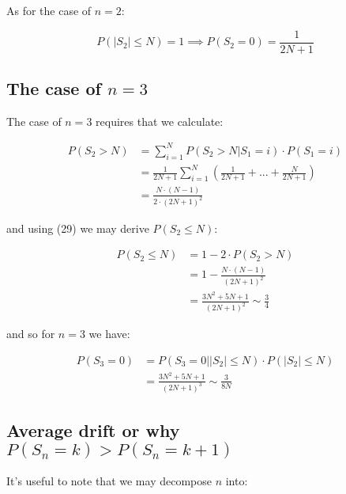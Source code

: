 \documentclass{article}
\begin{document}
As for the case of $n=2$:

\begin{equation}
	P(\lvert S_2 \rvert \leq N) =1 \implies P(S_2=0) = \frac{1}{2N+1}
\end{equation}

\subsection{The case of $n=3$}

The case of $n=3$ requires that we calculate:

\begin{equation}
\begin{split}
P(S_{2} > N) & = \sum_{i=1}^N P(S_{2} > N| S_1 = i) \cdot P( S_1 = i) \\\
& = \frac{1}{2N+1} \sum_{i=1}^N (\frac{1}{2N+1} + ... + \frac{N}{2N+1})  \\\
& = \frac{N \cdot (N-1)}{2 \cdot (2N+1)^2}
\end{split}
\end{equation}

and using (29) we may derive $P(S_{2} \leq N)$:

\begin{equation}
\begin{split}
P(S_{2} \leq N) & = 1 - 2 \cdot P(S_{2} > N) \\\
& = 1- \frac{N \cdot (N-1)}{(2N+1)^2}   \\\
& = \frac{3N^2+5N+1}{(2N+1)^2} \sim \frac{3}{4}
\end{split}
\end{equation}

and so for $n=3$ we have:

\begin{equation}
\begin{split}
P(S_{3} = 0) & = P(S_{3} = 0 | \lvert S_2 \rvert \leq N) \cdot P(\lvert S_2 \rvert \leq N)  \\\
& =  \frac{3N^2+5N+1}{(2N+1)^3} \sim \frac{3}{8N}
\end{split}
\end{equation}

\newpage

\subsection{Average drift or why $P(S_n=k) > P(S_n = k+1)$}

It's useful to note that we may decompose $n$ into:
\end{document}
